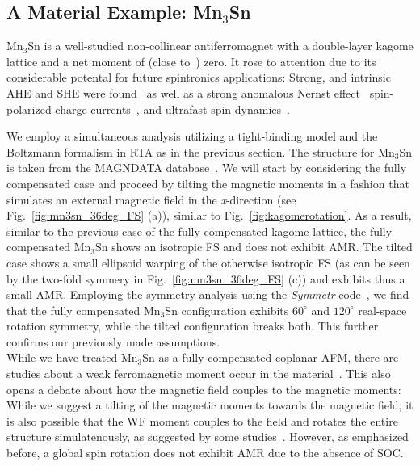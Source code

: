 \documentclass[prb,showpacs,amsmath,amssymb,superscriptaddress,twocolumn,floatfix]{revtex4-1}
\begin{document}
\subsection{A Material Example: Mn$_3$Sn}
\label{sec_I_mat}

Mn$_3$Sn is a well-studied non-collinear antiferromagnet with a double-layer kagome lattice and a net moment of (close to~\cite{Tomiyashi:1982}) zero. It rose to attention due to its considerable potental for future spintronics applications: Strong, and intrinsic AHE and SHE were found~\cite{Chen:2021, Manna:2018, Nakatsuji:2015, Zhou:2020, Zhang:2017} as well as a strong anomalous Nernst effect~\cite{Chen:2021, Manna:2018, Zhou:2020} spin-polarized charge currents~\cite{Zelezny:2017}, and ultrafast spin dynamics~\cite{Chen:2021, Nakatsuji:2015}.

We employ a simultaneous analysis utilizing a tight-binding model and the Boltzmann formalism in RTA as in the previous section. The structure for Mn$_3$Sn is taken from the MAGNDATA database~\cite{Magndata:Mn3Sn}. We will start by considering the fully compensated case and proceed by tilting the magnetic moments in a fashion that simulates an external magnetic field in the \textit{x}-direction (see Fig.~\ref{fig:mn3sn_36deg_FS} (a)), similar to Fig.~\ref{fig:kagomerotation}. As a result, similar to the previous case of the fully compensated kagome lattice, the fully compensated Mn$_3$Sn shows an isotropic FS and does not exhibit AMR. The tilted case shows a small ellipsoid warping of the otherwise isotropic FS (as can be seen by the two-fold symmery in Fig.~\ref{fig:mn3sn_36deg_FS} (c)) and exhibits thus a small AMR. Employing the symmetry analysis using the \textit{Symmetr} code~\cite{Symmetr}, we find that the fully compensated Mn$_3$Sn configuration exhibits $60^\circ$ and $120^\circ$ real-space rotation symmetry, while the tilted configuration breaks both. This further confirms our previously made assumptions. \\

While we have treated Mn$_3$Sn as a fully compensated coplanar AFM, there are studies about a weak ferromagnetic moment occur in the material~\cite{Tomiyashi:1982}. This also opens a debate about how the magnetic field couples to the magnetic moments: While we suggest a tilting of the magnetic moments towards the magnetic field, it is also possible that the WF moment couples to the field and rotates the entire structure simulatenously, as suggested by some studies~\cite{Wu:2023}. However, as emphasized before, a global spin rotation does not exhibit AMR due to the absence of SOC. 
\end{document}
